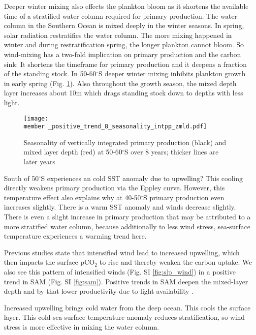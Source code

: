 \documentclass[12pt]{article}
\newcommand{\member}{m182_1988_1995} %
\begin{document}
Deeper winter mixing also effects the plankton bloom as it shortens the available time of a stratified water column required for primary production. The water column in the Southern Ocean is mixed deeply in the winter seasons. In spring, solar radiation restratifies the water column. The more mixing happened in winter and during restratification spring, the longer plankton cannot bloom. So wind-mixing has a two-fold implication on primary production and the carbon sink: It shortens the timeframe for primary production and it deepens a fraction of the standing stock. In 50-60$^\circ$S deeper winter mixing inhibits plankton growth in early spring (Fig. \ref{fig:zmld_intpp_seasonality}). Also throughout the growth season, the mixed depth layer increases about 10m which drags standing stock down to depths with less light.


\begin{figure}[h]
\centering
\texttt{[image: \\member \_positive\_trend\_8\_seasonality\_intpp\_zmld.pdf]} %
\caption{Seasonality of vertically integrated primary production (black) and mixed layer depth (red) at 50-60$^\circ$S over 8 years; thicker lines are later years}
\label{fig:zmld_intpp_seasonality}
\end{figure}

South of 50$^\circ$S experiences an cold SST anomaly due to upwelling? This cooling directly weakens primary production via the Eppley curve. However, this temperature effect also explains why at 40-50$^\circ$S primary production even increases slightly. There is a warm SST anomaly and winds decrease slightly. There is even a slight increase in primary production that may be attributed to a more stratified water column, because additionally to less wind stress, sea-surface temperature experiences a warming trend here.


Previous studies state that intensified wind lead to increased upwelling, which then impacts the surface pCO$_2$ to rise and thereby weaken the carbon uptake. We also see this pattern of intensified winds (Fig. SI \ref{fig:slp_wind}) in a positive trend in SAM (Fig. SI \ref{fig:sam}). Positive trends in SAM deepen the mixed-layer depth and by that lower productivity due to light availability \citep{Sallee2010}.

Increased upwelling brings cold water from the deep ocean. This cools the surface layer. This cold sea-surface temperature anomaly reduces stratification, so wind stress is more effective in mixing the water column.
\end{document}
